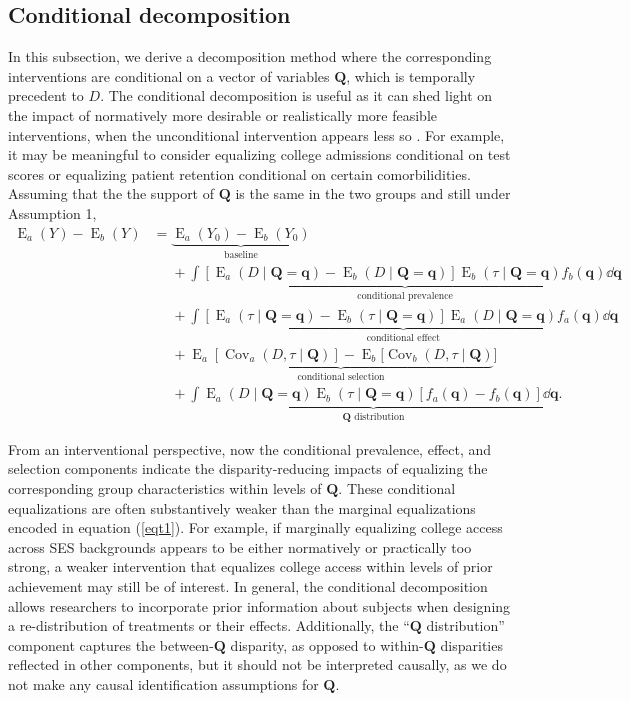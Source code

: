 \documentclass[12pt,a4paper]{article}
\newcommand{\Cov}{\operatorname{Cov}}
\newcommand{\E}{\operatorname{E}}
\def\Q{{\boldsymbol Q}}
\def\q{{\boldsymbol q}}
\begin{document}
\subsection{Conditional decomposition}
In this subsection, we derive a decomposition method where the corresponding interventions are conditional on a vector of variables $\boldsymbol{Q}$, which is temporally precedent to $D$. The conditional decomposition is useful as it can shed light on the impact of normatively more desirable or realistically more feasible interventions, when the unconditional intervention appears less so \citep{jackson_meaningful_2021}. For example, it may be meaningful to consider equalizing college admissions conditional on test scores or equalizing patient retention conditional on certain comorbilidities.
Assuming that the the support of $\Q$ is the same in the two groups and still under Assumption 1,
\begin{align}
    \E_a(Y)-\E_b(Y) &= \underbrace{\E_a(Y_0)-\E_b(Y_0)}_{\text{baseline}} \nonumber \\
    &\phantom{{}={}} + \underbrace{\int [\E_a(D \mid \Q=\q)-\E_b(D \mid \Q=\q)]\E_b(\tau \mid \Q=\q) f_b(\q) \dd \q}_{\text{conditional prevalence}} \nonumber \\
    &\phantom{{}={}} + \underbrace{\int [\E_a(\tau \mid \Q=\q)-\E_b(\tau \mid \Q=\q)] \E_a(D \mid \Q=\q) f_a(\q) \dd \q}_{\text{conditional effect}} \nonumber \\
    &\phantom{{}={}} + \underbrace{\E_a[\Cov_a(D, \tau \mid \Q)] - \E_b[\Cov_b(D, \tau \mid \Q)}_{\text{conditional selection}}] \nonumber \\
    &\phantom{{}={}} + \underbrace{\int \E_a(D \mid \Q=\q) \E_b(\tau \mid \Q=\q) [f_a(\q)-f_b(\q)] \dd \q}_{\text{$\Q$ distribution}}.
\end{align}

From an interventional perspective, now the conditional prevalence, effect, and selection components indicate the disparity-reducing impacts of equalizing the corresponding group characteristics within levels of $\Q$. These conditional equalizations are often substantively weaker than the marginal equalizations encoded in equation (\ref{eqt1}). For example, if marginally equalizing college access across SES backgrounds appears to be either normatively or practically too strong, a weaker intervention that equalizes college access within levels of prior achievement may still be of interest. In general, the conditional decomposition allows researchers to incorporate prior information about subjects when designing a re-distribution of treatments or their effects. Additionally, the ``$\Q$ distribution'' component captures the between-$\Q$ disparity, as opposed to within-$\Q$ disparities reflected in other components, but it should not be interpreted causally, as we do not make any causal identification assumptions for $\Q$.
\end{document}
